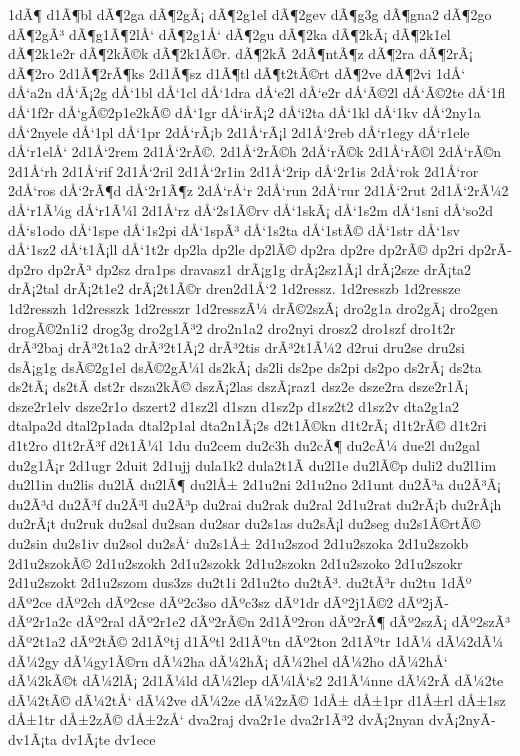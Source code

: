 {1dÃ¶
d1Ã¶bl
dÃ¶2ga
dÃ¶2gÃ¡
dÃ¶2g1el
dÃ¶2gev
dÃ¶g3g
dÃ¶gna2
dÃ¶2go
dÃ¶2gÃ³
dÃ¶g1Ã¶2lÅ‘
dÃ¶2g1Å‘
dÃ¶2gu
dÃ¶2ka
dÃ¶2kÃ¡
dÃ¶2k1el
dÃ¶2k1e2r
dÃ¶2kÃ©k
dÃ¶2k1Ã©r.
dÃ¶2kÃ­
2dÃ¶ntÃ¶z
dÃ¶2ra
dÃ¶2rÃ¡
dÃ¶2ro
2d1Ã¶2rÃ¶ks
2d1Ã¶sz
d1Ã¶tl
dÃ¶t2tÃ©rt
dÃ¶2ve
dÃ¶2vi
1dÅ‘
dÅ‘a2n
dÅ‘Ã¡2g
dÅ‘1bl
dÅ‘1cl
dÅ‘1dra
dÅ‘e2l
dÅ‘e2r
dÅ‘Ã©2l
dÅ‘Ã©2te
dÅ‘1fl
dÅ‘1f2r
dÅ‘gÃ©2p1e2kÃ©
dÅ‘1gr
dÅ‘irÃ¡2
dÅ‘i2ta
dÅ‘1kl
dÅ‘1kv
dÅ‘2ny1a
dÅ‘2nyele
dÅ‘1pl
dÅ‘1pr
2dÅ‘rÃ¡b
2d1Å‘rÃ¡l
2d1Å‘2reb
dÅ‘r1egy
dÅ‘r1ele
dÅ‘r1elÅ‘
2d1Å‘2rem
2d1Å‘2rÃ©.
2d1Å‘2rÃ©h
2dÅ‘rÃ©k
2d1Å‘rÃ©l
2dÅ‘rÃ©n
2d1Å‘rh
2d1Å‘rif
2d1Å‘2ril
2d1Å‘2r1in
2d1Å‘2rip
dÅ‘2r1is
2dÅ‘rok
2d1Å‘ror
2dÅ‘ros
dÅ‘2rÃ¶d
dÅ‘2r1Ã¶z
2dÅ‘rÅ‘r
2dÅ‘run
2dÅ‘rur
2d1Å‘2rut
2d1Å‘2rÃ¼2
dÅ‘r1Ã¼g
dÅ‘r1Ã¼l
2d1Å‘rz
dÅ‘2s1Ã©rv
dÅ‘1skÃ¡
dÅ‘1s2m
dÅ‘1sni
dÅ‘so2d
dÅ‘s1odo
dÅ‘1spe
dÅ‘1s2pi
dÅ‘1spÃ³
dÅ‘1s2ta
dÅ‘1stÃ©
dÅ‘1str
dÅ‘1sv
dÅ‘1sz2
dÅ‘t1Ã¡ll
dÅ‘1t2r
dp2la
dp2le
dp2lÃ©
dp2ra
dp2re
dp2rÃ©
dp2ri
dp2rÃ­
dp2ro
dp2rÃ³
dp2sz
dra1ps
dravasz1
drÃ¡g1g
drÃ¡2sz1Ã¡l
drÃ¡2sze
drÃ¡ta2
drÃ¡2tal
drÃ¡2t1e2
drÃ¡2t1Ã©r
dren2d1Å‘2
1d2ressz.
1d2resszb
1d2ressze
1d2resszh
1d2resszk
1d2resszr
1d2resszÃ¼
drÃ©2szÃ¡
dro2g1a
dro2gÃ¡
dro2gen
drogÃ©2n1i2
drog3g
dro2g1Ã³2
dro2n1a2
dro2nyi
drosz2
dro1szf
dro1t2r
drÃ³2baj
drÃ³2t1a2
drÃ³2t1Ã¡2
drÃ³2tis
drÃ³2t1Ã¼2
d2rui
dru2se
dru2si
dsÃ¡g1g
dsÃ©2g1el
dsÃ©2gÃ¼l
ds2kÃ¡
ds2li
ds2pe
ds2pi
ds2po
ds2rÃ¡
ds2ta
ds2tÃ¡
ds2tÃ­
dst2r
dsza2kÃ©
dszÃ¡2las
dszÃ¡raz1
dsz2e
dsze2ra
dsze2r1Ã¡
dsze2r1elv
dsze2r1o
dszert2
d1sz2l
d1szn
d1sz2p
d1sz2t2
d1sz2v
dta2g1a2
dtalpa2d
dtal2p1ada
dtal2p1al
dta2n1Ã¡2s
d2t1Ã©kn
d1t2rÃ¡
d1t2rÃ©
d1t2ri
d1t2ro
d1t2rÃ³f
d2t1Ã¼l
1du
du2cem
du2c3h
du2cÃ¶
du2cÃ¼
due2l
du2gal
du2g1Ã¡r
2d1ugr
2duit
2d1ujj
dula1k2
dula2t1Ã­
du2l1e
du2lÃ©p
duli2
du2l1im
du2l1in
du2lis
du2lÃ­
du2lÃ¶
du2lÅ±
2d1u2ni
2d1u2no
2d1unt
du2Ã³a
du2Ã³Ã¡
du2Ã³d
du2Ã³f
du2Ã³l
du2Ã³p
du2rai
du2rak
du2ral
2d1u2rat
du2rÃ¡b
du2rÃ¡h
du2rÃ¡t
du2ruk
du2sal
du2san
du2sar
du2s1as
du2sÃ¡l
du2seg
du2s1Ã©rtÃ©
du2sin
du2s1iv
du2sol
du2sÅ‘
du2s1Å±
2d1u2szod
2d1u2szoka
2d1u2szokb
2d1u2szokÃ©
2d1u2szokh
2d1u2szokk
2d1u2szokn
2d1u2szoko
2d1u2szokr
2d1u2szokt
2d1u2szom
dus3zs
du2t1i
2d1u2to
du2tÃ³.
du2tÃ³r
du2tu
1dÃº
dÃº2ce
dÃº2ch
dÃº2cse
dÃº2c3so
dÃºc3sz
dÃº1dr
dÃº2j1Ã©2
dÃº2jÃ­
dÃº2r1a2c
dÃº2ral
dÃº2r1e2
dÃº2rÃ©n
2d1Ãº2ron
dÃº2rÃ¶
dÃº2szÃ¡
dÃº2szÃ³
dÃº2t1a2
dÃº2tÃ©
2d1Ãºtj
d1Ãºtl
2d1Ãºtn
dÃº2ton
2d1Ãºtr
1dÃ¼
dÃ¼2dÃ¼
dÃ¼2gy
dÃ¼gy1Ã©rn
dÃ¼2ha
dÃ¼2hÃ¡
dÃ¼2hel
dÃ¼2ho
dÃ¼2hÅ‘
dÃ¼2kÃ©t
dÃ¼2lÃ¡
2d1Ã¼ld
dÃ¼2lep
dÃ¼lÅ‘s2
2d1Ã¼nne
dÃ¼2rÃ­
dÃ¼2te
dÃ¼2tÃ©
dÃ¼2tÅ‘
dÃ¼2ve
dÃ¼2ze
dÃ¼2zÃ©
1dÅ±
dÅ±1pr
d1Å±rl
dÅ±1sz
dÅ±1tr
dÅ±2zÃ©
dÅ±2zÅ‘
dva2raj
dva2r1e
dva2r1Ã³2
dvÃ¡2nyan
dvÃ¡2nyÃ­
dv1Ã¡ta
dv1Ã¡te
dv1ece
}
